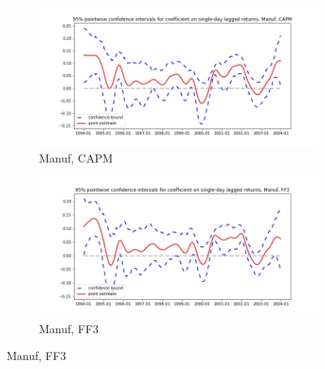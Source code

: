 \documentclass{article}
\begin{document}
 \begin{figure}
  \begin{subfigure}[b]{0.5\textwidth}
    \centering
    \includegraphics[width=\textwidth]{Manuf/pointwiseCIs_CAPM.jpg}
    \caption{Manuf, CAPM}
    \label{fig:1}
  \end{subfigure}
  \begin{subfigure}[b]{0.5\textwidth}
    \centering
    \includegraphics[width=\textwidth]{Manuf/pointwiseCIs_FF3.jpg}
    \caption{Manuf, FF3}
    \label{fig:2}
  \end{subfigure}
  \end{figure}
  
\end{document}
